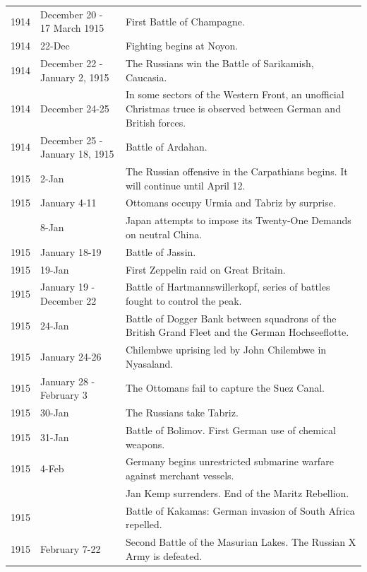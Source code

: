 \documentclass[
  openany]{book}
\begin{document}
\begin{longtable}[t]{rl>{\raggedright\arraybackslash}p{22em}}
\rowcolor{gray!6}  1914 & December 20 - 17 March 1915 & First Battle of Champagne.\\
1914 & 22-Dec & Fighting begins at Noyon.\\
\addlinespace
\rowcolor{gray!6}  1914 & December 22 - January 2, 1915 & The Russians win the Battle of Sarikamish, Caucasia.\\
1914 & December 24-25 & In some sectors of the Western Front, an unofficial Christmas truce is observed between German and British forces.\\
\rowcolor{gray!6}  1914 & December 25 - January 18, 1915 & Battle of Ardahan.\\
1915 & 2-Jan & The Russian offensive in the Carpathians begins. It will continue until April 12.\\
\rowcolor{gray!6}  1915 & January 4-11 & Ottomans occupy Urmia and Tabriz by surprise.\\
\addlinespace
1915 & 8-Jan & Japan attempts to impose its Twenty-One Demands on neutral China.\\
\rowcolor{gray!6}  1915 & January 18-19 & Battle of Jassin.\\
1915 & 19-Jan & First Zeppelin raid on Great Britain.\\
\rowcolor{gray!6}  1915 & January 19 - December 22 & Battle of Hartmannswillerkopf, series of battles fought to control the peak.\\
1915 & 24-Jan & Battle of Dogger Bank between squadrons of the British Grand Fleet and the German Hochseeflotte.\\
\addlinespace
\rowcolor{gray!6}  1915 & January 24-26 & Chilembwe uprising led by John Chilembwe in Nyasaland.\\
1915 & January 28 - February 3 & The Ottomans fail to capture the Suez Canal.\\
\rowcolor{gray!6}  1915 & 30-Jan & The Russians take Tabriz.\\
1915 & 31-Jan & Battle of Bolimov. First German use of chemical weapons.\\
\rowcolor{gray!6}  1915 & 4-Feb & Germany begins unrestricted submarine warfare against merchant vessels.\\
\addlinespace
1915 &  & Jan Kemp surrenders. End of the Maritz Rebellion.\\
\rowcolor{gray!6}  1915 &  & Battle of Kakamas: German invasion of South Africa repelled.\\
1915 & February 7-22 & Second Battle of the Masurian Lakes. The Russian X Army is defeated.\\

\end{longtable}
\end{document}
